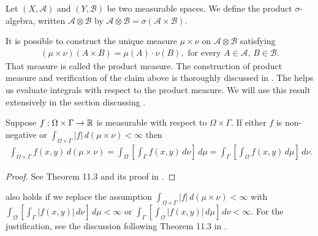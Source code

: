 \begin{definition}
Let $(X, \mathcal{A})$ and $(Y, \mathcal{B})$ be two measurable spaces. We define the product $\sigma$-algebra, written $\mathcal{A} \otimes \mathcal{B}$ by $\mathcal{A} \otimes \mathcal{B} = \sigma(\mathcal{A} \times \mathcal{B})$. 
\end{definition}
It is possible to construct the unique measure $\mu \times \nu$ on $\mathcal{A} \otimes \mathcal{B}$ satisfying 
\begin{align*}
    (\mu \times \nu) (A \times B) = \mu(A) \cdot \nu(B), \text{ for every $A \in \mathcal{A}$, $B \in \mathcal{B}$}.
\end{align*}
That measure is called the product measure. The construction of product measure and verification of the claim above is thoroughly discussed in \cite{bass2011real}. The  helps us evaluate integrals with respect to the product measure. We will use this result extensively in the section discussing .
\begin{theorem}
\label{thm:measure:fubini}
Suppose $f : \Omega \times \Gamma \to {\mathbb R}$ is measurable with respect to $\Omega \times \Gamma$. If either $f$ is non-negative or $\int_{\Omega \times \Gamma} |f| \,d (\mu \times \nu) < \infty$ then
\begin{align*}
       \int_{\Omega \times \Gamma} f (x, y) \,d (\mu \times \nu) = \int_{\Omega} \left [ \int_{\Gamma} f(x,y) \, d\nu \right] \, d\mu = \int_{\Gamma} \left [ \int_{\Omega} f(x,y) \, d\mu \right] \, d\nu.
\end{align*}
\end{theorem}
\begin{proof}
See Theorem 11.3 and its proof in \cite{bass2011real}.
\end{proof}
\begin{remark}
 also holds if we replace the assumption $\int_{\Omega \times \Gamma} |f| \,d (\mu \times \nu) < \infty$ with $\int_{\Omega} \left [ \int_{\Gamma} |f(x,y)| \, d\nu \right] \, d\mu < \infty$ or $\int_{\Gamma} \left [ \int_{\Omega} |f(x,y)| \, d\mu \right] \, d\nu < \infty$. For the justification, see the discussion following Theorem 11.3 in \cite{bass2011real}.
\end{remark}